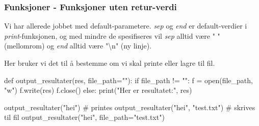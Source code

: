 \begin{frame}[fragile]
    \frametitle{Funksjoner - Funksjoner uten retur-verdi}

    Vi har allerede jobbet med default-parametere. \textit{sep} og \textit{end} er default-verdier i \textit{print}-funksjonen, og med mindre de spesifiseres vil \textit{sep} alltid være " " (mellomrom) og \textit{end} alltid være "\textbackslash n" (ny linje). 

    Her bruker vi det til å bestemme om vi skal printe eller lagre til fil. 

\begin{python}
def output_resultater(res, file_path=""):
    if file_path != "":
        f = open(file_path, "w")
        f.write(res)
        f.close()
    else:
        print("Her er resultatet:", res)

output_resultater("hei") # printes
output_resultater("hei", "test.txt") # skrives til fil
output_resultater("hei", file_path="test.txt")
\end{python}

\end{frame}
